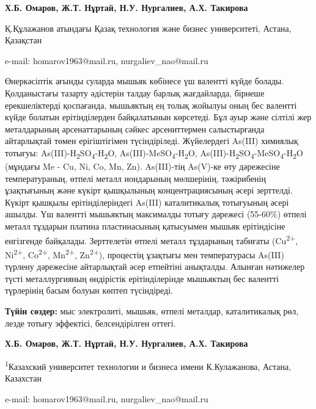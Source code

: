 
\begin{center}
{\bfseries Х.Б. Омаров\envelope, Ж.Т. Нұртай, Н.У.
Нургалиев\envelope, А.Х. Такирова}

Қ.Құлажанов атындағы Қазақ технология және бизнес университеті, Астана,
Қазақстан

e-mail: homarov1963@mail.ru, nurgaliev\_nao@mail.ru
\end{center}

Өнеркәсіптік ағынды суларда мышьяк көбінесе үш валентті күйде болады.
Қолданыстағы тазарту әдістерін талдау барлық жағдайларда, бірнеше
ерекшеліктерді қоспағанда, мышьяктың ең толық жойылуы оның бес валентті
күйде болатын ерітінділерден байқалатынын көрсетеді. Бұл ауыр және
сілтілі жер металдарының арсенаттарының сәйкес арсениттермен
салыстырғанда айтарлықтай төмен ерігіштігімен түсіндіріледі. Жүйелердегі
As(III) химиялық тотығуы:
As(III)-H\textsubscript{2}SO\textsubscript{4}-H\textsubscript{2}O,
As(III)-MeSO\textsubscript{4}-H\textsubscript{2}O,
As(III)-H\textsubscript{2}SO\textsubscript{4}-MeSO\textsubscript{4}-H\textsubscript{2}O
(мұндағы Me - Cu, Ni, Co, Mn, Zn). As(III)-тің As(V)-ке өту дәрежесіне
температураның, өтпелі металл иондарының мөлшерінің, тәжірибенің
ұзақтығының және күкірт қышқылының концентрациясының әсері зерттелді.
Күкірт қышқылы ерітінділеріндегі As(III) каталитикалық тотығуының әсері
ашылды. Үш валентті мышьяктың максималды тотығу дәрежесі (55-60\%)
өтпелі металл тұздарын платина пластинасының қатысуымен мышьяк
ерітіндісіне енгізгенде байқалады. Зерттелетін өтпелі металл тұздарының
табиғаты (Cu\textsuperscript{2+}, Ni\textsuperscript{2+},
Co\textsuperscript{2+}, Mn\textsuperscript{2+}, Zn\textsuperscript{2+}),
процестің ұзақтығы мен температурасы As(III) түрлену дәрежесіне
айтарлықтай әсер етпейтіні анықталды. Алынған нәтижелер түсті
металлургияның өндірістік ерітінділерінде мышьяктың бес валентті
түрлерінің басым болуын көптеп түсіндіреді.

{\bfseries Түйін сөздер:} мыс электролиті, мышьяк, өтпелі металдар,
каталитикалық рөл, лезде тотығу эффектісі, белсендірілген оттегі.


\begin{center}
{\bfseries Х.Б. Омаров\envelope, Ж.Т. Нұртай, Н.У.
Нургалиев\envelope, А.Х. Такирова}

\textsuperscript{1}Казахский университет технологии и бизнеса имени
К.Кулажанова, Астана, Казахстан

e-mail: homarov1963@mail.ru, nurgaliev\_nao@mail.ru
\end{center}

